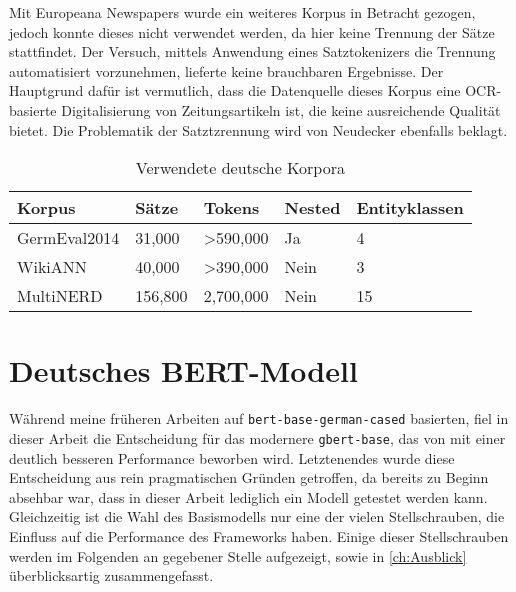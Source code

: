 Mit Europeana Newspapers \parencite{europeana} wurde ein weiteres Korpus in Betracht gezogen, jedoch konnte dieses nicht verwendet werden, da hier keine Trennung der Sätze stattfindet. Der Versuch, mittels Anwendung eines Satztokenizers die Trennung automatisiert vorzunehmen, lieferte keine brauchbaren Ergebnisse. Der Hauptgrund dafür ist vermutlich, dass die Datenquelle dieses Korpus eine OCR-basierte Digitalisierung von Zeitungsartikeln ist, die keine ausreichende Qualität bietet. Die Problematik der Satztzrennung wird von Neudecker ebenfalls beklagt.

\begin{table}[!htbp]
	\centering
	\caption{Verwendete deutsche Korpora}
	\label{tab:korpora}
	\begin{tabular}{@{}lllll@{}}
		\toprule
		\textbf{Korpus}   & \textbf{Sätze} & \textbf{Tokens}       & \textbf{Nested} & \textbf{Entityklassen} \\ \midrule
		GermEval2014    & 31,000         & \textgreater{}590,000 & Ja              & 4                       \\
		WikiANN         & 40,000         & \textgreater{}390,000 & Nein            & 3                       \\
		MultiNERD\footnotemark       & 156,800        & 2,700,000             & Nein            & 15                      \\ \bottomrule
		\end{tabular}
\end{table}

\section{Deutsches BERT-Modell}
\label{ch:Training:sec:DeutschBERT}

Während meine früheren Arbeiten auf \verb|bert-base-german-cased| \parencite{bert-base-german-cased} basierten, fiel in dieser Arbeit die Entscheidung für das modernere \verb|gbert-base|, das von \cite{gbert} mit einer deutlich besseren Performance beworben wird. Letztenendes wurde diese Entscheidung aus rein pragmatischen Gründen getroffen, da bereits zu Beginn absehbar war, dass in dieser Arbeit lediglich ein Modell getestet werden kann. Gleichzeitig ist die Wahl des Basismodells nur eine der vielen Stellschrauben, die Einfluss auf die Performance des Frameworks haben. Einige dieser Stellschrauben werden im Folgenden an gegebener Stelle aufgezeigt, sowie in \autoref{ch:Ausblick} überblicksartig zusammengefasst.


